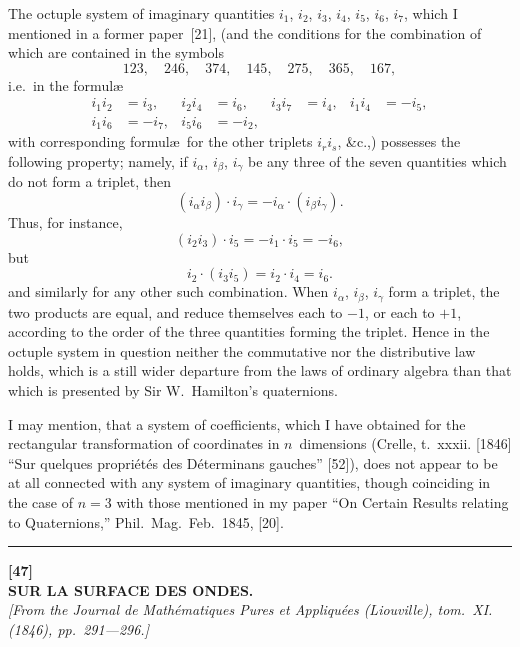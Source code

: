 \documentclass[11pt,a4paper]{article}
\begin{document}
\vspace{6pt}

The octuple system of imaginary quantities $i_1$, $i_2$, $i_3$, $i_4$, $i_5$, $i_6$, $i_7$, which I mentioned in a former paper~[21], (and the conditions for the combination of which are contained in the symbols
\[
123, \quad 246, \quad 374, \quad 145, \quad 275, \quad 365, \quad 167,
\]
i.e.\ in the formul\ae
\begin{align*}
i_1 i_2 &= i_3, & i_2 i_4 &= i_6, & i_3 i_7 &= i_4, & i_1 i_4 &= -i_5, \\
i_1 i_6 &= -i_7, & i_5 i_6 &= -i_2, &
\end{align*}
with corresponding formul\ae\ for the other triplets $i_r i_s$, \&c.,) possesses the following property; namely, if $i_\alpha$, $i_\beta$, $i_\gamma$ be any three of the seven quantities which do not form a triplet, then
\[
(i_\alpha i_\beta) \cdot i_\gamma = -i_\alpha \cdot (i_\beta i_\gamma).
\]
Thus, for instance,
\[
(i_2 i_3) \cdot i_5 = -i_1 \cdot i_5 = -i_6,
\]
but
\[
i_2 \cdot (i_3 i_5) = i_2 \cdot i_4 = i_6.
\]
and similarly for any other such combination. When $i_\alpha$, $i_\beta$, $i_\gamma$ form a triplet, the two products are equal, and reduce themselves each to $-1$, or each to $+1$, according to the order of the three quantities forming the triplet. Hence in the octuple system in question neither the commutative nor the distributive law holds, which is a still wider departure from the laws of ordinary algebra than that which is presented by Sir W.~Hamilton's quaternions.

I may mention, that a system of coefficients, which I have obtained for the rectangular transformation of coordinates in $n$~dimensions (Crelle, t.~xxxii. [1846] ``Sur quelques propri\'et\'es des D\'eterminans gauches'' [52]), does not appear to be at all connected with any system of imaginary quantities, though coinciding in the case of $n=3$ with those mentioned in my paper ``On Certain Results relating to Quaternions,'' Phil.\ Mag.\ Feb.\ 1845, [20].

\vspace{20pt}
\begin{center}
\rule{0.5\textwidth}{0.4pt}
\end{center}


\newpage
{}
\begin{center}
\textbf{[47]}\\[4pt]
\textbf{\large SUR LA SURFACE DES ONDES.}\\[4pt]
\textit{[From the Journal de Math\'ematiques Pures et Appliqu\'ees (Liouville), tom.~XI. (1846), pp.~291---296.]}
\end{center}
\end{document}
